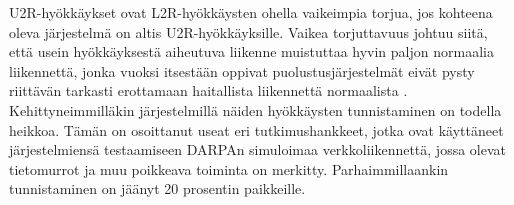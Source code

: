 U2R-hyökkäykset ovat L2R-hyökkäysten ohella vaikeimpia torjua, jos kohteena
oleva järjestelmä on altis U2R-hyökkäyksille. Vaikea torjuttavuus johtuu siitä, että
usein hyökkäyksestä aiheutuva liikenne muistuttaa hyvin paljon normaalia
liikennettä, jonka vuoksi itsestään oppivat puolustusjärjestelmät eivät pysty
riittävän tarkasti erottamaan haitallista liikennettä normaalista \cite{U2R}.
Kehittyneimmilläkin järjestelmillä näiden hyökkäysten tunnistaminen on todella
heikkoa. Tämän on osoittanut useat eri tutkimushankkeet, jotka ovat käyttäneet
järjestelmiensä testaamiseen DARPAn simuloimaa verkkoliikennettä,
jossa olevat tietomurrot ja muu poikkeava toiminta on merkitty.
Parhaimmillaankin tunnistaminen on jäänyt 20 prosentin
paikkeille.
